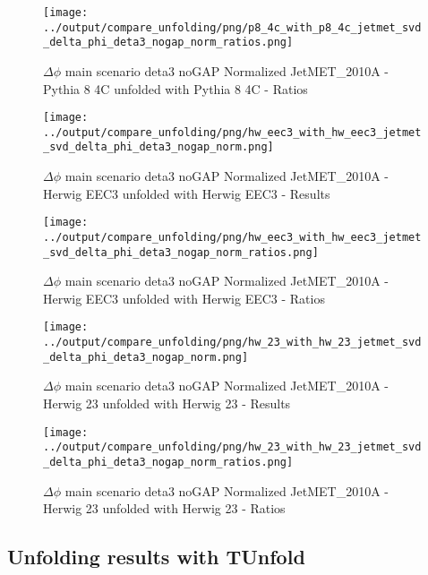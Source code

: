 \documentclass[11pt]{book}
\begin{document}
\begin{figure}[ht]
\centering
\texttt{[image: ../output/compare\_unfolding/png/p8\_4c\_with\_p8\_4c\_jetmet\_svd\_delta\_phi\_deta3\_nogap\_norm\_ratios.png]}
\caption{$\Delta\phi$ main scenario deta3 noGAP Normalized JetMET\_2010A - Pythia 8 4C unfolded with Pythia 8 4C - Ratios}
\label{p8_p8_jetmet_svd_delta_phi_deta3_nogap_norm_b}
\end{figure}

\begin{figure}[ht]
\centering
\texttt{[image: ../output/compare\_unfolding/png/hw\_eec3\_with\_hw\_eec3\_jetmet\_svd\_delta\_phi\_deta3\_nogap\_norm.png]}
\caption{$\Delta\phi$ main scenario deta3 noGAP Normalized JetMET\_2010A - Herwig EEC3 unfolded with Herwig EEC3 - Results}
\label{hw_eec3_hw_eec3_jetmet_svd_delta_phi_deta3_nogap_norm_a}
\end{figure}

\begin{figure}[ht]
\centering
\texttt{[image: ../output/compare\_unfolding/png/hw\_eec3\_with\_hw\_eec3\_jetmet\_svd\_delta\_phi\_deta3\_nogap\_norm\_ratios.png]}
\caption{$\Delta\phi$ main scenario deta3 noGAP Normalized JetMET\_2010A - Herwig EEC3 unfolded with Herwig EEC3 - Ratios}
\label{hw_eec3_hw_eec3_jetmet_svd_delta_phi_deta3_nogap_norm_b}
\end{figure}

\begin{figure}[ht]
\centering
\texttt{[image: ../output/compare\_unfolding/png/hw\_23\_with\_hw\_23\_jetmet\_svd\_delta\_phi\_deta3\_nogap\_norm.png]}
\caption{$\Delta\phi$ main scenario deta3 noGAP Normalized JetMET\_2010A - Herwig 23 unfolded with Herwig 23 - Results}
\label{hw_23_hw_23_jetmet_svd_delta_phi_deta3_nogap_norm_a}
\end{figure}

\begin{figure}[ht]
\centering
\texttt{[image: ../output/compare\_unfolding/png/hw\_23\_with\_hw\_23\_jetmet\_svd\_delta\_phi\_deta3\_nogap\_norm\_ratios.png]}
\caption{$\Delta\phi$ main scenario deta3 noGAP Normalized JetMET\_2010A - Herwig 23 unfolded with Herwig 23 - Ratios}
\label{hw_23_hw_23_jetmet_svd_delta_phi_deta3_nogap_norm_b}
\end{figure}


\clearpage
\subsection{Unfolding results with TUnfold}
\end{document}
